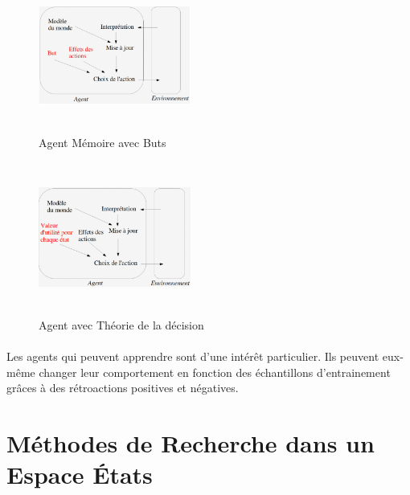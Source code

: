 \documentclass{book}
\begin{document}
\begin{figure}[!ht]
\centering
\includegraphics[width=5cm, height=5cm, keepaspectratio]{Agent_Memoire_But.png}
\caption{Agent Mémoire avec Buts}
\label{fig:agentmembut}
\end{figure}
	
\begin{figure}[!ht]
\centering
\includegraphics[width=5cm, height=5cm, keepaspectratio]{Agent_Memoire_Theorie.png}
\caption{Agent avec Théorie de la décision}
\label{fig:agenttheorie}
\end{figure}
\paragraph{}
Les agents qui peuvent apprendre sont d'une intérêt particulier. Ils peuvent eux-même changer leur comportement en fonction des échantillons d'entrainement grâces à des rétroactions positives et négatives.
\section{Méthodes de Recherche dans un Espace États}
\end{document}
